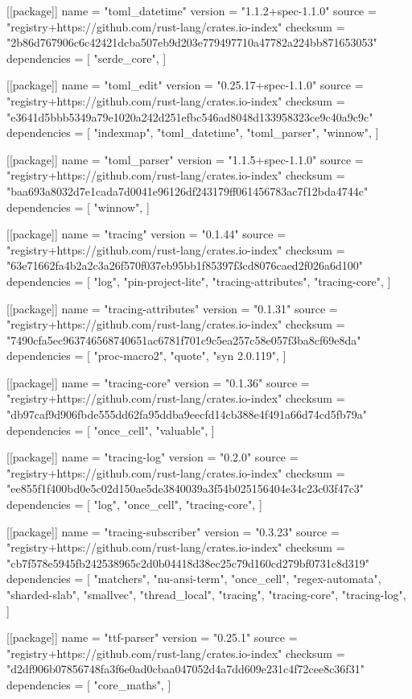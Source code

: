 [[package]]
name = "toml_datetime"
version = "1.1.2+spec-1.1.0"
source = "registry+https://github.com/rust-lang/crates.io-index"
checksum = "2b86d767906c6c42421dcba507eb9d203e779497710a47782a224bb871653053"
dependencies = [
 "serde_core",
]

[[package]]
name = "toml_edit"
version = "0.25.17+spec-1.1.0"
source = "registry+https://github.com/rust-lang/crates.io-index"
checksum = "e3641d5bbb5349a79e1020a242d251efbc546ad8048d133958323ce9c40a9c9c"
dependencies = [
 "indexmap",
 "toml_datetime",
 "toml_parser",
 "winnow",
]

[[package]]
name = "toml_parser"
version = "1.1.5+spec-1.1.0"
source = "registry+https://github.com/rust-lang/crates.io-index"
checksum = "baa693a8032d7e1cada7d0041e96126df243179ff061456783ac7f12bda4744c"
dependencies = [
 "winnow",
]

[[package]]
name = "tracing"
version = "0.1.44"
source = "registry+https://github.com/rust-lang/crates.io-index"
checksum = "63e71662fa4b2a2c3a26f570f037eb95bb1f85397f3cd8076caed2f026a6d100"
dependencies = [
 "log",
 "pin-project-lite",
 "tracing-attributes",
 "tracing-core",
]

[[package]]
name = "tracing-attributes"
version = "0.1.31"
source = "registry+https://github.com/rust-lang/crates.io-index"
checksum = "7490cfa5ec963746568740651ac6781f701c9c5ea257c58e057f3ba8cf69e8da"
dependencies = [
 "proc-macro2",
 "quote",
 "syn 2.0.119",
]

[[package]]
name = "tracing-core"
version = "0.1.36"
source = "registry+https://github.com/rust-lang/crates.io-index"
checksum = "db97caf9d906fbde555dd62fa95ddba9eecfd14cb388e4f491a66d74cd5fb79a"
dependencies = [
 "once_cell",
 "valuable",
]

[[package]]
name = "tracing-log"
version = "0.2.0"
source = "registry+https://github.com/rust-lang/crates.io-index"
checksum = "ee855f1f400bd0e5c02d150ae5de3840039a3f54b025156404e34c23c03f47c3"
dependencies = [
 "log",
 "once_cell",
 "tracing-core",
]

[[package]]
name = "tracing-subscriber"
version = "0.3.23"
source = "registry+https://github.com/rust-lang/crates.io-index"
checksum = "cb7f578e5945fb242538965c2d0b04418d38ec25c79d160cd279bf0731c8d319"
dependencies = [
 "matchers",
 "nu-ansi-term",
 "once_cell",
 "regex-automata",
 "sharded-slab",
 "smallvec",
 "thread_local",
 "tracing",
 "tracing-core",
 "tracing-log",
]

[[package]]
name = "ttf-parser"
version = "0.25.1"
source = "registry+https://github.com/rust-lang/crates.io-index"
checksum = "d2df906b07856748fa3f6e0ad0cbaa047052d4a7dd609e231c4f72cee8c36f31"
dependencies = [
 "core_maths",
]

